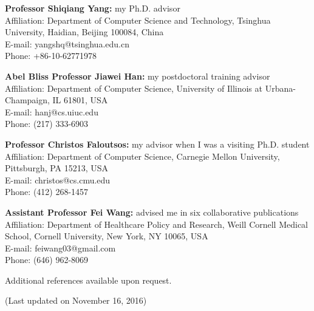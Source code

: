 \documentclass[margin, 10pt]{res}
\begin{document}
\begin{resume}
\textbf{Professor Shiqiang Yang:} my Ph.D. advisor \\
{Affiliation}: {Department of Computer Science and Technology, Tsinghua University, Haidian, Beijing 100084, China} \\
{E-mail:} {yangshq@tsinghua.edu.cn} \\
{Phone:} {+86-10-62771978}

\textbf{Abel Bliss Professor Jiawei Han:} my postdoctoral training advisor \\
{Affiliation}: {Department of Computer Science, University of Illinois at Urbana-Champaign, IL 61801, USA} \\
{E-mail:} {hanj@cs.uiuc.edu} \\
{Phone:} {(217) 333-6903}

\textbf{Professor Christos Faloutsos:} my advisor when I was a visiting Ph.D. student \\
{Affiliation}: {Department of Computer Science, Carnegie Mellon University, Pittsburgh, PA 15213, USA} \\
{E-mail:} {christos@cs.cmu.edu} \\
{Phone:} {(412) 268-1457}

\textbf{Assistant Professor Fei Wang:} advised me in six collaborative publications \\
{Affiliation}: {Department of Healthcare Policy and Research, Weill Cornell Medical School, Cornell University, New York, NY 10065, USA} \\
{E-mail:} {feiwang03@gmail.com} \\
{Phone:} {(646) 962-8069}

Additional references available upon request.

(Last updated on November 16, 2016)
\end{resume}
\end{document}
